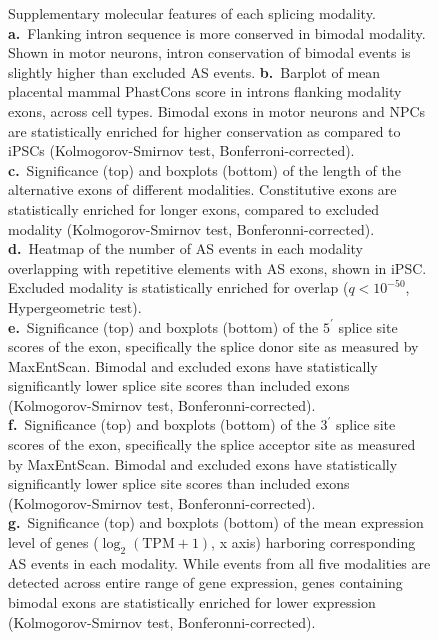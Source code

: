 \clearpage
\thispagestyle{facingcaption}
\begin{figure}[h]
\captionsetup{labelformat=prev-page}
\caption[Supplementary molecular features of each splicing modality.]{
Supplementary molecular features of each splicing modality.\\
\textbf{a.}~Flanking intron sequence is more conserved in  bimodal modality. Shown in motor neurons,  intron conservation of bimodal events is slightly higher than excluded AS events.
\textbf{b.}~Barplot of mean placental mammal PhastCons score in introns flanking modality exons, across cell types. Bimodal exons in motor neurons  and NPCs are statistically enriched for higher conservation as compared to iPSCs (Kolmogorov-Smirnov test, Bonferroni-corrected).\\
\textbf{c.}~Significance (top) and boxplots (bottom) of the length of the alternative exons of different modalities. Constitutive exons are statistically enriched for longer exons, compared to excluded modality (Kolmogorov-Smirnov test, Bonferonni-corrected).\\
\textbf{d.}~Heatmap of the number of AS events in each modality overlapping with repetitive elements with AS exons, shown in iPSC. Excluded modality is statistically enriched for overlap ($q < 10^{-50}$, Hypergeometric test).\\
\textbf{e.}~Significance (top) and boxplots (bottom) of the $5^\prime$ splice site scores of the exon, specifically the splice donor site as measured by MaxEntScan. Bimodal and excluded exons have statistically significantly lower splice site scores than included exons (Kolmogorov-Smirnov test, Bonferonni-corrected).\\
\textbf{f.}~Significance (top) and boxplots (bottom) of the $3^\prime$ splice site scores of the exon, specifically the splice acceptor site as measured by MaxEntScan. Bimodal and excluded exons have statistically significantly lower splice site scores than included exons (Kolmogorov-Smirnov test, Bonferonni-corrected).\\
\textbf{g.}~Significance (top) and boxplots (bottom) of the mean expression level of genes ($\log_2(\mathrm{TPM}+1)$, x axis) harboring corresponding AS events in each modality. While events from all five modalities are detected across entire range of gene expression, genes containing bimodal exons are statistically enriched for lower expression (Kolmogorov-Smirnov test, Bonferonni-corrected).\\
}
\end{figure}
